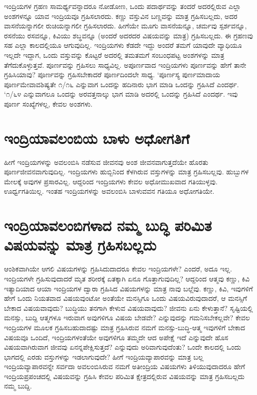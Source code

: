ಇಂದ್ರಿಯಗಳ ಗ್ರಹಣ ಸಾಮರ್ಥ್ಯವನ್ನಾದರೂ ನೋಡೋಣ, ಒಂದು ಪದಾರ್ಥವನ್ನು ತಂದರೆ ಅದರಲ್ಲಿರುವ ಎಲ್ಲಾ ಅಂಶಗಳನ್ನೂ ಯಾವ ಇಂದ್ರಿಯವೂ ಗ್ರಹಿಸಲಾರದು. ಕಣ್ಣು ವಸ್ತುವಿನ ಬಣ್ಣವನ್ನು ಮಾತ್ರ ಗ್ರಹಿಸಬಲ್ಲದು, ಅದರ ವಾಸನೆಯನ್ನಾಗಲೀ ರುಚಿಯನ್ನಾಗಲೀ ಗ್ರಹಿಸಲಾರದು. ಹೀಗೆಯೇ ಮೂಗು ವಾಸನೆಯನ್ನೂ, ಚರ್ಮವು ಸ್ಪರ್ಶವನ್ನೂ, ರಸನೆಯು ರಸವನ್ನೂ, ಕಿವಿಯು ಶಬ್ಥವನ್ನೂ (ಅಂದರೆ ಅದರದರ ವಿಷಯವನ್ನು ಮಾತ್ರ) ಗ್ರಹಿಸಬಲ್ಲದು. ಈ ಗ್ರಹಣವು ಸಹ ಎಲ್ಲಾ ಕಾಲದಲ್ಲಿಯೂ ಆಗುವುದಿಲ್ಲ. ಇಂದ್ರಿಯಗಳು ಕೆಡದೇ ಇದ್ದು ಅಂದರೆ ತಮಗೆ ಯಾವುದೇ ವ್ಯಾಧಿಯೂ ಇಲ್ಲದೇ ಇದ್ದಾಗ, ಒಂದು ವಸ್ತುವನ್ನು ಕೊಟ್ಟರೆ ಅದರಲ್ಲಿ ತಮತಮಗೆ ಸಂಬಂಧಪಟ್ಟ ಅಂಶಗಳನ್ನು ಮಾತ್ರ ತೆಗೆದುಕೊಳ್ಳುತ್ತವೆ. ಪೂರ್ಣವನ್ನು ಗ್ರಹಿಸಲು ಸಾಧ್ಯವಿಲ್ಲ. ಅಪೂರ್ಣವಾದ ಇಂದ್ರಿಯಗಳು ಪೂರ್ಣವನ್ನು ಹೇಗೆ ತಾನೇ ಗ್ರಹಿಸಿಯಾವು? ಪೂರ್ಣವನ್ನು ಗ್ರಹಿಸಬೇಕಾದರೆ ಪೂರ್ಣದಿಂದಲೇ ಸಾಧ್ಯ. `ಪೂರ್ಣಸ್ಯ ಪುರ್ಣಮಾದಾಯ\label{268} ಪೂರ್ಣಮೇವಾವಶಿಷ್ಯತೇ ೧/೧೬ ಎನ್ನುವಾಗ ಒಂದನ್ನು ಹದಿನಾರು ಭಾಗ ಮಾಡಿ ಒಂದನ್ನು ಗ್ರಹಿಸಿದೆ ಎಂದರ್ಥ. `೧/೬೪ ಎನ್ನುವಾಗಲೂ ಒಂದನ್ನು ಅರವತ್ತನಾಲ್ಕು ಭಾಗ ಮಾಡಿ ಅದರಲ್ಲಿ ಒಂದನ್ನು ಗ್ರಹಿಸಿದೆ ಎಂದರ್ಥ. ಇವು ಪೂರ್ಣ ಸಂಖ್ಯೆಗಳಲ್ಲ, ಕೇವಲ ಅಂಶಗಳು.

\section*{ಇಂದ್ರಿಯಾವಲಂಬಿಯ ಬಾಳು ಅಧೋಗತಿಗೆ}

ಹೀಗೆ ಇಂದ್ರಿಯಗಳನ್ನು ಅವಲಂಬಿಸಿ ನಡೆಸುವ ಜೀವನವು ಅಂಶ ಜೀವನವಾಗುತ್ತದೆಯೇ ಹೊರತು ಪೂರ್ಣಜೀವನವಾಗುವುದಿಲ್ಲ. ಇಂದ್ರಿಯಗಳು ಹುಬ್ಬಿನಿಂದ ಕೆಳಗಿರುವ ವಸ್ತುಗಳನ್ನು ಮಾತ್ರ ಗ್ರಹಿಸಬಲ್ಲವು. ಹುಬ್ಬುಗಳ ಮೇಲಕ್ಕೆ ಅವುಗಳ ಪ್ರಸಾರವಿಲ್ಲ. ಆದ್ದರಿಂದ ಇಂದ್ರಿಯಗಳು ಕೇವಲ ಅಧೋಮುಖವಾದ ಗತಿಯುಳ್ಳವು. ಊರ್ಧ್ವಗತಿಯಿಲ್ಲ. ಇಂತಹ ಇಂದ್ರಿಯಗಳನ್ನು ಅವಲಂಬಿಸಿ ಬಾಳುವವನ ಗತಿಯೂ ಅಧೋಗತಿಯೇ.

\section*{ಇಂದ್ರಿಯಾವಲಂಬಿಗಳಾದ ನಮ್ಮ ಬುದ್ಧಿ ಪರಿಮಿತ ವಿಷಯವನ್ನು ಮಾತ್ರ ಗ್ರಹಿಸಬಲ್ಲದು}

ಆಂಶಿಕವಾಗಿಯೇ ಆಗಲಿ ವಿಷಯಗಳನ್ನು ಗ್ರಹಿಸಿದುದಾದರೂ ಕೇವಲ ಇಂದ್ರಿಯಗಳೇ? ಎಂದರೆ, ಅದೂ ಇಲ್ಲ. ಇಂದ್ರಿಯಗಳೇ ಗ್ರಹಿಸುವುದಾದರೆ ಮೃತ ಶರೀರಕ್ಕೆ ಏತಕ್ಕಾಗಿ ಏನೂ ಗೊತ್ತಾಗುವುದಿಲ್ಲ? ಆದ್ದರಿಂದ ಆತ್ಮವು ಕಣ್ಣು, ಕಿವಿ ಇತ್ಯಾದಿಯಾದ ಆಯಾ ಇಂದ್ರಿಯಗಳ ದ್ವಾರಾ ಗ್ರಹಿಸಿದ ವಿಷಯಗಳನ್ನು ಮಾತ್ರ ನಾವು ಬಲ್ಲೆವು. ಕಣ್ಣು, ಕಿವಿ, ಇವುಗಳಿಗೆ ಹೇಗೆ ಒಂದು ನಿಯತವಾದ ವಿಷಯವುಂಟೋ ಅಂತೆಯೇ ಮನಸ್ಸಿಗೂ ಒಂದು ವಿಷಯವಿರುವುದಾದರೆ, ಆ ಮನಸ್ಸಿಗೆ ಬೇಕಾದ ವಿಷಯವಾವುದು? ಬುದ್ಧಿಯು ತನಗಾಗಿ ಕೇಳುವ ವಿಷಯವಾವುದು? ಜೀವನು ಏನು ಕೇಳುತ್ತಾನೆ? ಸೃಷ್ಟಿಯಲ್ಲಿ ಮನಸ್ಸು, ಬುದ್ದಿ ಆತ್ಮಗಳೂ ಇರುವಾಗ ಅವುಗಳಿಗೂ ವಿಷಯ ಬೇಡವೇ? ಎನ್ನುವುದನ್ನು ಗಮನಿಸಬೇಕಲ್ಲವೇ? ಕೇವಲ ಇಂದ್ರಿಯಗಳ ಮೂಲಕ ಗ್ರಹಿಸಬಹುದಾದಷ್ಟು  ಮಾತ್ರ ಗ್ರಹಿಸಿರುವ ನಮಗೆ ಮನಸ್ಸು-ಬುದ್ಧಿ-ಆತ್ಮ ಇವುಗಳಿಗೆ ಬೇಕಾದ ವಿಷಯವೂ ಒಂದಿದೆ, ಇಂದ್ರಿಯಗಳಂತೆಯೇ ಅವುಗಳಿಗೂ ತಮ್ಮದೇ ಆದ ಅಪೇಕ್ಷೆ ಇದೆ ಎನ್ನುವುದೇ ಹೊಸ ವಿಷಯವಾಗಿರುವಾಗ ಜೀವವು ಏನನ್ನಪೇಕ್ಷಿಸುತ್ತದೆ? ಎನ್ನುವುದು ಅರಿವಾಗುವುದೆಂತು? ಒಂದೇ ಕಾಲದಲ್ಲಿ ಒಂದು ಭಾಗದಲ್ಲಿ ಎರಡು ವಸ್ತುಗಳನ್ನು ಇಡಲಾಗುವುದೇ? ಹೀಗೆ ಇಂದ್ರಿಯವ್ಯಾಪಾರವನ್ನು ಮಾತ್ರ ಬಲ್ಲ ಇಂದ್ರಿಯವ್ಯಾಪಾರವನ್ನೇ ಸರ್ವದಾ ಅವಲಂಬಿಸಿರುವ ನಮಗೆ ಅತೀಂದ್ರಿಯ ವಿಷಯಗಳು ತಿಳಿಯುವುದಾದರೂ ಹೇಗೆ ಇಂದ್ರಿಯಪ್ರಪಂಚದಲ್ಲಿ ವಿಷಯವನ್ನು ಗ್ರಹಿಸಿ ಕೇವಲ ಪರಿಮಿತ ಕ್ಷೇತ್ರದಲ್ಲಿರುವ ವಿಷಯವನ್ನು ಮಾತ್ರ ಗ್ರಹಿಸಬಲ್ಲದು ನಮ್ಮ ಬುದ್ದಿ.

